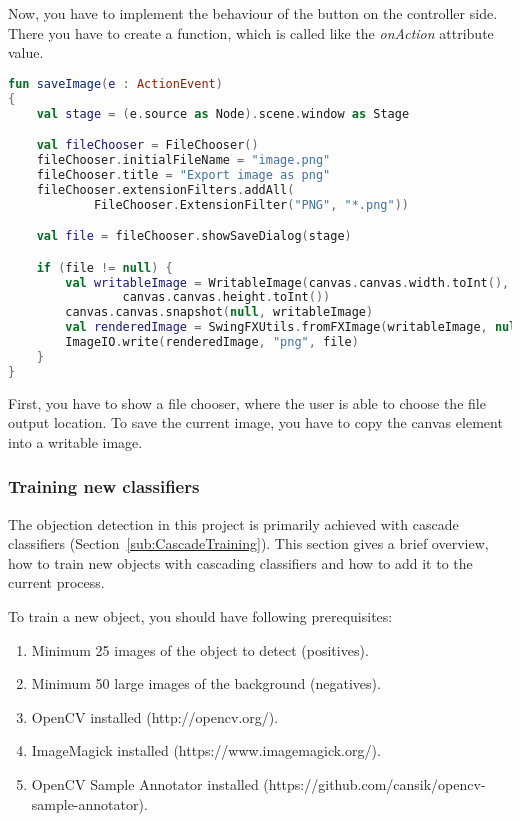 Now, you have to implement the behaviour of the button on the controller side. There you have to create a function, which is called like the \textit{onAction} attribute value.

\begin{lstlisting}[caption={Save image controller code.}, label={lst:saveImage}, language=Kotlin, escapechar=$]
fun saveImage(e : ActionEvent)
{
    val stage = (e.source as Node).scene.window as Stage

    val fileChooser = FileChooser()
    fileChooser.initialFileName = "image.png"
    fileChooser.title = "Export image as png"
    fileChooser.extensionFilters.addAll(
            FileChooser.ExtensionFilter("PNG", "*.png"))

    val file = fileChooser.showSaveDialog(stage)

    if (file != null) {
        val writableImage = WritableImage(canvas.canvas.width.toInt(),
                canvas.canvas.height.toInt())
        canvas.canvas.snapshot(null, writableImage)
        val renderedImage = SwingFXUtils.fromFXImage(writableImage, null)
        ImageIO.write(renderedImage, "png", file)
    }
}
\end{lstlisting}

First, you have to show a file chooser, where the user is able to choose the file output location. To save the current image, you have to copy the canvas element into a writable image.

\subsubsection{Training new classifiers}

The objection detection in this project is primarily achieved with cascade classifiers (Section~\ref{sub:CascadeTraining}). This section gives a brief overview, how to train new objects with cascading classifiers and how to add it to the current process.

To train a new object, you should have following prerequisites:

\renewcommand{\labelenumi}{\alph{enumi})}
\begin{enumerate}
    \item Minimum 25 images of the object to detect (positives).
    \item Minimum 50 large images of the background (negatives).
    \item OpenCV installed (http://opencv.org/).
    \item ImageMagick installed (https://www.imagemagick.org/).
    \item OpenCV Sample Annotator installed (https://github.com/cansik/opencv-sample-annotator).
\end{enumerate}

